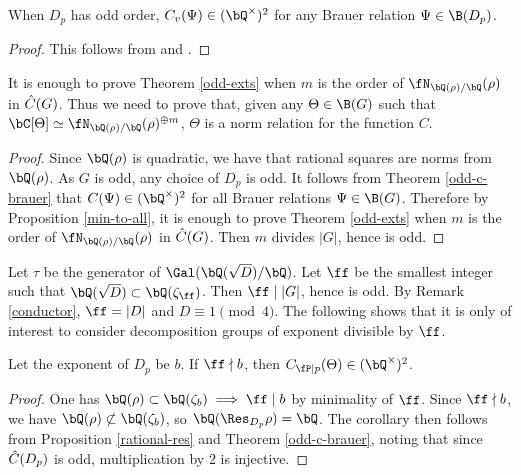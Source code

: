 \begin{thm}\label{odd-c-brauer}
    When $D_p$ has odd order, $C_v(\Psi) \in (\bQ^{\times})^2$ for any Brauer relation $\Psi \in \B(D_p)$. 
\end{thm}

\begin{proof}
    This follows from \cite[Theorem 2.47]{reg-const} and \cite[Theorem 3.2  (Tam)]{reg-const}.
\end{proof}

\begin{cor}
It is enough to prove Theorem \ref{odd-exts} when $m$ is the order of $\repnorm{\rho}$ in $\hat{C}(G)$. Thus we need to prove that, given any $
\Theta \in \B(G)$ such that $\bC[\Theta] \simeq \repnorm{\rho}^{\oplus m}$, $\Theta$ is a norm relation for the function $C$. 
\end{cor}

\begin{proof}
    Since $\bQ(\rho)$ is quadratic, we have that rational squares are norms from $\bQ(\rho)$. As $G$ is odd, any choice of $D_p$ is odd. It follows from Theorem \ref{odd-c-brauer} that $C(\Psi) \in (\bQ^{\times})^2$ for all Brauer relations $\Psi \in \B(G)$. Therefore by Proposition \ref{min-to-all}, it is enough to prove Theorem \ref{odd-exts} when $m$ is the order of $\repnorm{\rho}$ in $\hat{C}(G)$. Then $m$ divides $|G|$, hence is odd.
\end{proof}

Let $\tau$ be the generator of $\Gal(\bQ(\sqrt{D}) / \bQ)$.
Let $\ff$ be the smallest integer such that $\bQ(\sqrt{D}) \subset \bQ(\zeta_{\ff})$. Then $\ff \mid |G|$, hence is odd. By Remark \ref{conductor}, $\ff = |D|$ and $D \equiv 1 \pmod 4$. The following shows that it is only of interest to consider decomposition groups of exponent divisible by $\ff$.

\begin{cor}\label{rational-res-2}
    Let the exponent of $D_p$ be $b$. If $\ff \nmid b$, then $C_{\fP \mid p}(\Theta) \in (\bQ^{\times})^2$.
\end{cor}

\begin{proof}
    One has $\bQ(\rho) \subset \bQ(\zeta_b) \implies \ff \mid b$ by minimality of $\ff$. Since $\ff \nmid b$, we have $\bQ(\rho) \not\subset \bQ(\zeta_b)$, so $\bQ(\Res_{D_p} \rho) = \bQ$. The corollary then follows from Proposition \ref{rational-res} and Theorem \ref{odd-c-brauer}, noting that since $\hat{C}(D_p)$ is odd, multiplication by $2$ is injective. 
\end{proof}

